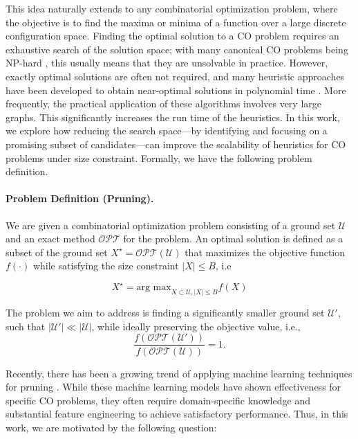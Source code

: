 \documentclass[letterpaper]{article} %
\begin{document}
This idea naturally extends to any combinatorial optimization problem, where the objective is to find the maxima or minima of a function over a large discrete configuration space. Finding the optimal solution to a CO problem requires an exhaustive search of the solution space; with many canonical CO problems being NP-hard \cite{karp2009reducibility}, this usually means that they are unsolvable in practice. However, exactly optimal solutions are often not required, and many heuristic approaches have been developed to obtain near-optimal solutions in polynomial time \cite{nemhauser1978analysis,kempe2003maximizing,tang2015influence}.  More frequently, the practical application of these algorithms involves very large graphs. This significantly increases the run time of the heuristics. In this work, we explore how reducing the search space—by identifying and focusing on a promising subset of candidates—can improve the scalability of heuristics for CO problems under size constraint. Formally, we have the following problem definition.


\paragraph{Problem Definition (Pruning).} We are given a combinatorial optimization problem consisting of a ground set \(\mathcal{U}\) and an exact method \(\mathcal{OPT}\) for the problem. An optimal solution is defined as a subset of the ground set \(X^\star = \mathcal{OPT} (\mathcal{U}) \) that maximizes the objective function \(f(\cdot)\) while satisfying the size constraint \(|X| \leq B\), i.e


\[X^\star  = \text{arg max}_{X \subset  \mathcal{U},|X|\leq B} f(X)\]

The problem we aim to address is finding a significantly smaller ground set \(\mathcal{U}'\), such that \(|\mathcal{U}'| \ll |\mathcal{U}|\), while ideally preserving the objective value, i.e.,  
\[
\frac{f(\mathcal{OPT}(\mathcal{U}'))}{f(\mathcal{OPT}(\mathcal{U}))} = 1. \]  


Recently, there has been a growing trend of applying machine learning techniques for pruning \cite{lauri2019fine, grassia2019learning, sun2021generalization, ireland2022lense, tian2024combhelper}. While these machine learning models have shown effectiveness for specific CO problems, they often require domain-specific knowledge and substantial feature engineering to achieve satisfactory performance. Thus, in this work, we are motivated by the following question:
\end{document}
